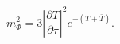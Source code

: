 \begin{equation}
m^{2}_{\Phi} = 
3 |\frac{\partial T}{\partial \tau}|^2 e^{-(T + \bar{T})}.
\end{equation}

